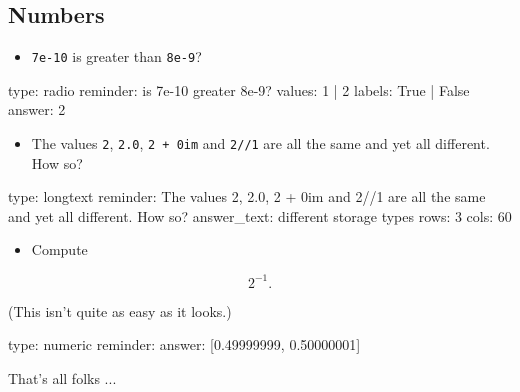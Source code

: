 \documentclass[12pt]{article}
\begin{document}
\subsection{Numbers}

\begin{itemize}
\itemsep1pt\parskip0pt
\item
  \texttt{7e-10} is greater than \texttt{8e-9}?
\end{itemize}

\begin{answer}
type: radio
reminder: is 7e-10 greater 8e-9?
values: 1 | 2
labels: True | False
answer: 2
\end{answer}

\begin{itemize}
\itemsep1pt\parskip0pt
\item
  The values \texttt{2}, \texttt{2.0}, \texttt{2 + 0im} and
  \texttt{2//1} are all the same and yet all different. How so?
\end{itemize}

\begin{answer}
type: longtext
reminder: The values 2, 2.0, 2 + 0im and 2//1 are all the same and yet all different. How so?
answer_text: different storage types 
rows: 3
cols: 60
\end{answer}

\begin{itemize}
\itemsep1pt\parskip0pt
\item
  Compute
\end{itemize}

\[
2^{-1}.
\]

(This isn't quite as easy as it looks.)

\begin{answer}
    type: numeric
    reminder: 
    answer: [0.49999999, 0.50000001]

\end{answer}

That's all folks ...
\end{document}

